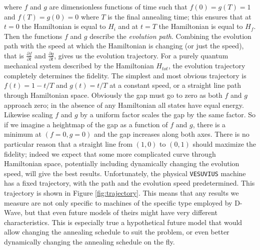 where $f$ and $g$ are dimensionless functions of time such that $f(0) = g(T) = 1$ and $f(T) = g(0) = 0$ where $T$ is the final annealing time; this ensures that at $t = 0$ the Hamiltonian is equal to $H_i$ and at $t = T$ the Hamiltonian is equal to $H_f$.  Then the functions $f$ and $g$ describe the \emph{evolution path}.  Combining the evolution path with the speed at which the Hamiltonian is changing (or just the speed), that is $\frac{\partial f}{\partial t}$ and $\frac{\partial g}{\partial t}$, gives us the evolution trajectory.  For a purely quantum mechanical system described by the Hamiltonian $H_{tot}$, the evolution trajectory completely determines the fidelity.
The simplest and most obvious trajectory is $f(t) = 1 - t/T$ and $g(t) = t/T$ at a constant speed, or a straight line path through Hamiltonian space.
Obviously the gap must go to zero as both $f$ and $g$ approach zero; in the absence of any Hamiltonian all states have equal energy.  Likewise scaling $f$ and $g$ by a uniform factor scales the gap by the same factor.  So if we imagine a heightmap of the gap as a function of $f$ and $g$, there is a minimum at $(f=0,g=0)$ and the gap increases along both axes.  
There is no particular reason that a straight line from $(1,0)$ to $(0,1)$ should maximize the fidelity; indeed we expect that some more complicated curve through Hamiltonian space, potentially including dynamically changing the evolution speed, will give the best results.
Unfortunately, the physical \texttt{VESUVIUS} machine has a fixed trajectory, with the path and the evolution speed predetermined.  This trajectory is shown in Figure \ref{fig:trajectory}.
This means that any results we measure are not only specific to machines of the specific type employed by D-Wave, but that even future models of theirs might have very different characteristics.  This is especially true a hypothetical future model that would allow changing the annealing schedule to suit the problem, or even better dynamically changing the annealing schedule on the fly.
